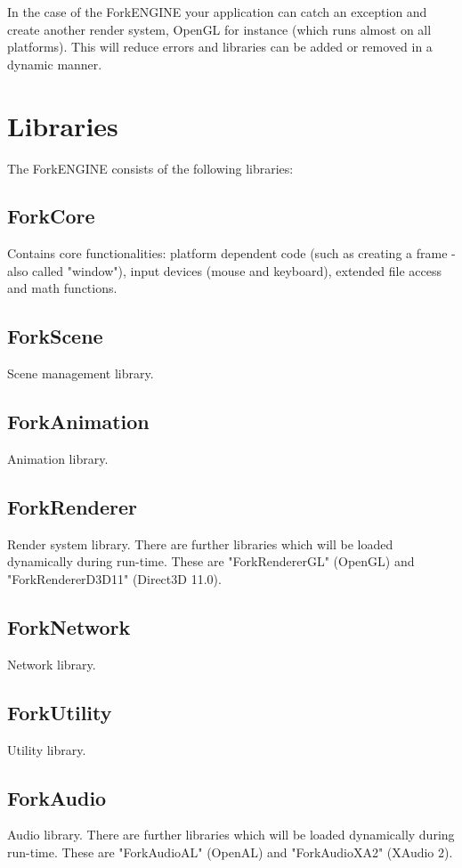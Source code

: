 \documentclass{article}
\begin{document}
In the case of the ForkENGINE your application can catch an exception and
create another render system, OpenGL for instance (which runs almost on all platforms).
This will reduce errors and libraries can be added or removed in a dynamic manner.

\section{Libraries}

The ForkENGINE consists of the following libraries:

\subsection{ForkCore}
Contains core functionalities: platform dependent code (such as creating a frame - also called "window"),
input devices (mouse and keyboard), extended file access and math functions.

\subsection{ForkScene}
Scene management library.

\subsection{ForkAnimation}
Animation library.

\subsection{ForkRenderer}
Render system library.
There are further libraries which will be loaded dynamically during run-time.
These are "ForkRendererGL" (OpenGL) and "ForkRendererD3D11" (Direct3D 11.0).

\subsection{ForkNetwork}
Network library.

\subsection{ForkUtility}
Utility library.

\subsection{ForkAudio}
Audio library.
There are further libraries which will be loaded dynamically during run-time.
These are "ForkAudioAL" (OpenAL) and "ForkAudioXA2" (XAudio 2).
\end{document}
